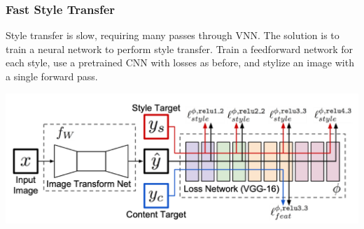 \subsubsection{Fast Style Transfer}
Style transfer is slow, requiring many passes through VNN. The solution is to train a neural network to perform style transfer.
Train a feedforward network for each style, use a pretrained CNN with losses as before, and stylize an image with a single forward pass.

\begin{center}
	\includegraphics[width=0.7\linewidth]{img/fast_style_transfer}
\end{center}
